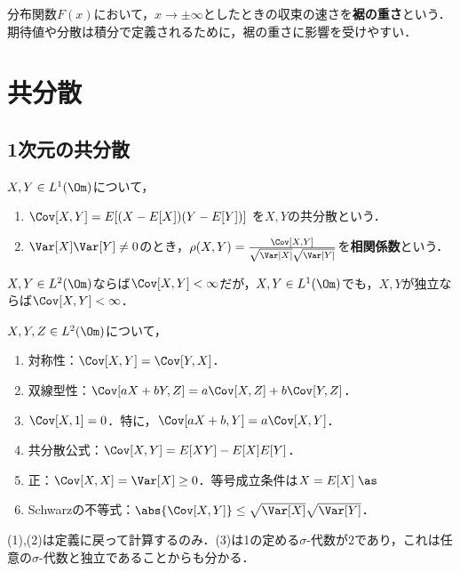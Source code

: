 \documentclass[uplatex,dvipdfmx]{jsreport}
\begin{document}
\begin{definition}
    分布関数$F(x)$において，$x\to\pm\infty$としたときの収束の速さを\textbf{裾の重さ}という．
    期待値や分散は積分で定義されるために，裾の重さに影響を受けやすい．
\end{definition}

\section{共分散}

\subsection{1次元の共分散}

\begin{definition}
    $X,Y\in L^1(\Om)$について，
    \begin{enumerate}
        \item $\Cov[X,Y]=E[(X-E[X])(Y-E[Y])]$
        を$X,Y$の共分散という．
        \item $\Var[X]\Var[Y]\ne 0$のとき，$\rho(X,Y)=\frac{\Cov[X,Y]}{\sqrt{\Var[X]}\sqrt{\Var[Y]}}$を\textbf{相関係数}という．
    \end{enumerate}
\end{definition}
\begin{remark}
    $X,Y\in L^2(\Om)$ならば$\Cov[X,Y]<\infty$だが，$X,Y\in L^1(\Om)$でも，$X,Y$が独立ならば$\Cov[X,Y]<\infty$．
\end{remark}

\begin{proposition}[1次元分散の性質]\label{prop-1d-covariance}
    $X,Y,Z\in L^2(\Om)$について，
    \begin{enumerate}
        \item 対称性：$\Cov[X,Y]=\Cov[Y,X]$．
        \item 双線型性：$\Cov[aX+bY,Z]=a\Cov[X,Z]+b\Cov[Y,Z]$．
        \item $\Cov[X,1]=0$．特に，$\Cov[aX+b,Y]=a\Cov[X,Y]$．
        \item 共分散公式：$\Cov[X,Y]=E[XY]-E[X]E[Y]$．
        \item 正：$\Cov[X,X]=\Var[X]\ge 0$．等号成立条件は$X=E[X]\;\as$
        \item Schwarzの不等式：$\abs{\Cov[X,Y]}\le\sqrt{\Var[X]}\sqrt{\Var[Y]}$．
    \end{enumerate}
\end{proposition}
\begin{Proof}
    (1),(2)は定義に戻って計算するのみ．(3)は1の定める$\sigma$-代数が$2$であり，これは任意の$\sigma$-代数と独立であることからも分かる．
\end{Proof}
\end{document}
